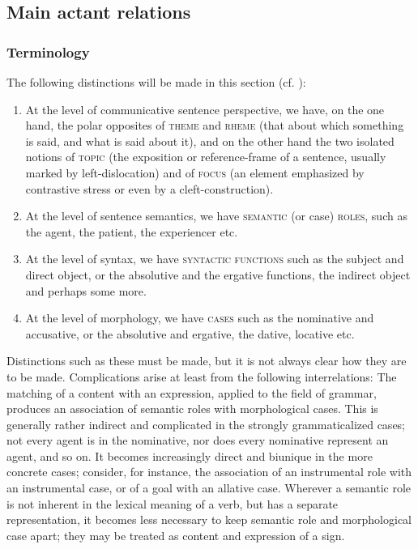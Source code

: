 \subsection{Main actant relations} \label{sec:3.4.2}
\subsubsection{Terminology} \label{sec:3.4.2.1}

The following distinctions will be made in this section (cf. \citealt[34ff]{Hagège1978}):

\begin{enumerate}
\item At the level of communicative sentence perspective, we have, on the one hand, the polar opposites of \textsc{theme} and \textsc{rheme} (that about which something is said, and what is said about it), and on the other hand the two isolated notions of \textsc{topic} (the exposition or reference-frame of a sentence, usually marked by left-dislocation) and of \textsc{focus} (an element emphasized by contrastive stress or even by a cleft-construction).

\item At the level of sentence semantics, we have \textsc{semantic} (or case) \textsc{roles}, such as the agent, the patient, the experiencer etc.

\item At the level of syntax, we have \textsc{syntactic functions} such as the subject and direct object, or the absolutive and the ergative functions, the indirect object and perhaps some more.

\item At the level of morphology, we have \textsc{cases} such as the nominative and accusative, or the absolutive and ergative, the dative, locative etc.

\end{enumerate}

Distinctions such as these must be made, but it is not always clear how they are to be made. Complications arise at least from the following interrelations: The matching of a content with an expression, applied to the field of grammar, produces an association of semantic roles with morphological cases. This is generally rather indirect and complicated in the strongly grammaticalized cases; not every agent is in the nominative, nor does every nominative represent an agent, and so on. It becomes increasingly direct and biunique in the more concrete cases; consider, for instance, the association of an instrumental role with an instrumental case, or of a goal with an allative case. Wherever a semantic role is not inherent in the lexical meaning of a verb, but has a separate representation, it becomes less necessary to keep semantic role and morphological case apart; they may be treated as content and expression of a sign.

